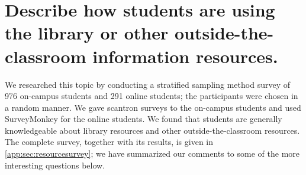 



\section[Library and other outside-the-classroom information
resources]{Describe how students are using the library or other
outside-the-classroom information resources.  }
We researched this topic by conducting a stratified sampling method
survey of 976 on-campus students and 291 online students; the participants were
chosen in a random manner.  We gave scantron surveys to the on-campus students
and used SurveyMonkey for the online students. We found that students are
generally knowledgeable about library resources and other outside-the-classroom
resources.  The complete survey, together with its results, is given in
\vref{app:sec:resourcesurvey}; we have summarized our comments to some of the 
more interesting questions below.


